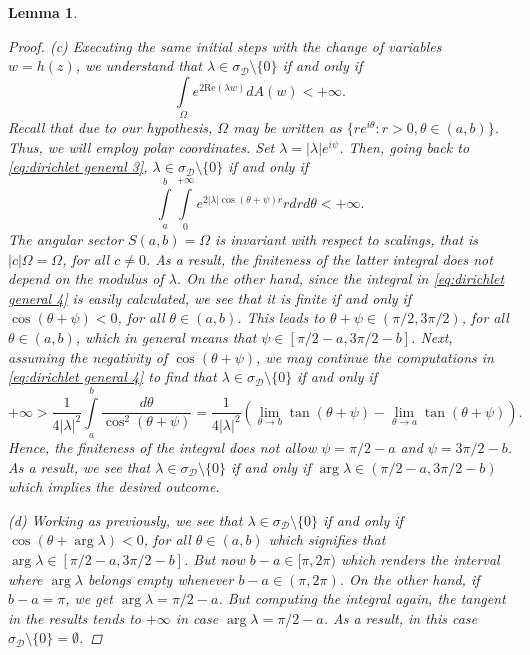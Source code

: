 \documentclass[11pt]{amsart}
\numberwithin{equation}{section}
\newtheorem{lemma}[theorem]{Lemma}
\theoremstyle{definition}
\begin{document}
\begin{lemma}
\begin{proof}
			(c) Executing the same initial steps with the change of variables $w=h(z)$, we understand that $\lambda\in\sigma_\mathcal{D}\setminus\{0\}$ if and only if
			\begin{equation}\label{eq:dirichlet general 3}
				\int\limits_{\Omega} e^{2\mathrm{Re}(\lambda w)} dA(w)<+\infty.
			\end{equation}
			Recall that due to our hypothesis, $\Omega$ may be written as $\{re^{i\theta}:r>0,\theta\in(a,b)\}$. Thus, we will employ polar coordinates. Set $\lambda=|\lambda|e^{i\psi}$. Then, going back to \eqref{eq:dirichlet general 3}, $\lambda\in\sigma_\mathcal{D}\setminus\{0\}$ if and only if
			\begin{equation}\label{eq:dirichlet general 4}
				\int\limits_{a}^{b}\int\limits_{0}^{+\infty}e^{2|\lambda|\cos(\theta+\psi)r}rdrd\theta<+\infty.
			\end{equation}
			The angular sector $S(a,b)=\Omega$ is invariant with respect to scalings, that is $|c|\Omega=\Omega$, for all $c\ne0$. As a result, the finiteness of the latter integral does not depend on the modulus of $\lambda$. On the other hand, since the integral in \eqref{eq:dirichlet general 4} is easily calculated, we see that it is finite if and only if $\cos(\theta+\psi)<0$, for all $\theta\in(a,b)$. This leads to $\theta+\psi\in(\pi/2,3\pi/2)$, for all $\theta\in(a,b)$, which in general means that $\psi\in[\pi/2-a,3\pi/2-b]$. Next, assuming the negativity of $\cos(\theta+\psi)$, we may continue the computations in \eqref{eq:dirichlet general 4} to find that $\lambda\in\sigma_\mathcal{D}\setminus\{0\}$ if and only if
			\begin{equation*}
				+\infty>\dfrac{1}{4|\lambda|^2}\int\limits_{a}^{b}\dfrac{d\theta}{\cos^2(\theta+\psi)}=\dfrac{1}{4|\lambda|^2}\left(\lim\limits_{\theta\to b}\tan(\theta+\psi)-\lim\limits_{\theta\to a}\tan(\theta+\psi)\right).
			\end{equation*}
			Hence, the finiteness of the integral does not allow $\psi=\pi/2-a$ and $\psi=3\pi/2-b$. As a result, we see that $\lambda\in\sigma_\mathcal{D}\setminus\{0\}$ if and only if $\arg\lambda\in(\pi/2-a,3\pi/2-b)$ which implies the desired outcome.
			
			(d) Working as previously, we see that $\lambda\in\sigma_\mathcal{D}\setminus\{0\}$ if and only if $\cos(\theta+\arg\lambda)<0$, for all $\theta\in(a,b)$ which signifies that $\arg\lambda\in[\pi/2-a,3\pi/2-b]$. But now $b-a\in[\pi,2\pi)$ which renders the interval where $\arg\lambda$ belongs empty whenever $b-a\in(\pi,2\pi)$. On the other hand, if $b-a=\pi$, we get $\arg\lambda=\pi/2-a$. But computing the integral again, the tangent in the results tends to $+\infty$ in case $\arg\lambda=\pi/2-a$. As a result, in this case $\sigma_\mathcal{D}\setminus\{0\}=\emptyset$.
		\end{proof}
	\end{lemma}
	
\end{document}

